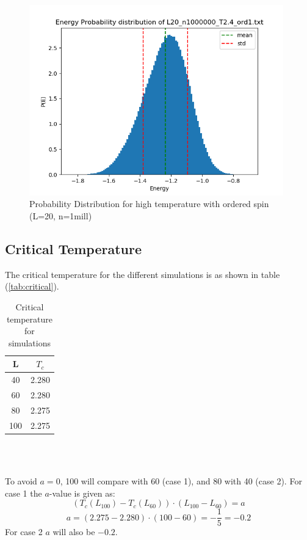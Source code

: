 \documentclass{article}
\begin{document}
  \begin{figure}[ht]
      \centering
      \includegraphics[width = 11cm]{img/energyhistogram_L20_n1000000_T24_ord1.png}
      \caption{Probability Distribution for high temperature with ordered spin (L=20, n=1mill)}
      \label{fig:prob-highT-ord1}
    \end{figure}

  \subsection{Critical Temperature}

  The critical temperature for the different simulations is as shown in table (\ref{tab:critical}).

    \begin{table}[ht]
      \centering
      \caption{Critical temperature for simulations}
      \vspace{2mm}
      \label{tab:critical2}
      \begin{tabular}{|c|c|}
          \hline
           L & $T_c$\\
          \hline \hline
          40 & 2.280 \\
          60 & 2.280 \\
          80 & 2.275 \\
          100 & 2.275 \\
          \hline
      \end{tabular} \\
      \hspace{0pt}\\
    \end{table}

  To avoid $a=0$, 100 will compare with 60 (case 1), and 80 with 40 (case 2).
  For case 1 the $a$-value is given as:
  $$(T_c(L_{100})-T_c(L_{60}))\cdot(L_{100}-L_{60})=a$$
  $$a=(2.275-2.280)\cdot(100-60)=-\frac{1}{5}=-0.2$$
  For case 2 $a$ will also be $-0.2$.
\end{document}
